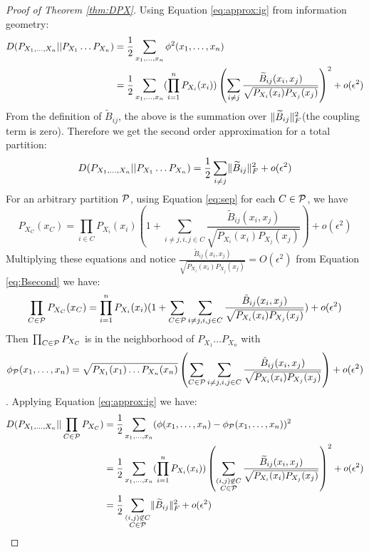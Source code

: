 \begin{proof}[Proof of Theorem \ref{thm:DPX}]
Using Equation \eqref{eq:approx:ig} from information geometry:
\begin{align*}
D(P_{X_1,\dots, X_n}|| P_{X_1}\dots P_{X_n}) & ={1 \over 2} \sum_{x_1,\dots,x_n}\phi^2(x_1,\dots, x_n) \\
& = {1\over 2}\sum_{x_1,\dots,x_n} (\prod_{i=1}^n  P_{X_i} (x_i)) \left(\sum_{i\neq j}{\widetilde{B}_{ij}(x_i, x_j) \over \sqrt{P_{X_i}(x_i)P_{X_j}(x_j)} }\right)^2 +o(\epsilon^2) 
\end{align*}
From the definition of $\widetilde{B}_{ij}$, the above is the summation over $\norm{\widetilde{B}_{ij}}^2_F$(the coupling term is zero). Therefore we get the second order approximation for a total partition:
\begin{equation}
D(P_{X_1,\dots, X_n}|| P_{X_1}\dots P_{X_n}) =   {1 \over 2} \sum_{i\neq j} \norm{\widetilde{B}_{ij}}^2_F + o(\epsilon^2)
\end{equation}
For an arbitrary partition $\P$, using Equation \eqref{eq:sep} for each $C\in \P$, we have
\begin{equation}
P_{X_C}(x_C) = \prod_{i\in C} P_{X_i}(x_i)(1+\sum_{i\neq j,i,j\in C} \frac{\tilde{B}_{ij}(x_i, x_j)}{\sqrt{P_{X_i}(x_i)P_{X_j}(x_j)}}) + o(\epsilon^2)
\end{equation}
Multiplying these equations and notice $\frac{\tilde{B}_{ij}(x_i, x_j)}{\sqrt{P_{X_i}(x_i)P_{X_j}(x_j)}}=O(\epsilon^2)$ from
Equation \eqref{eq:Bsecond} we have:
\begin{equation}
\prod_{C\in \P}P_{X_C}(x_C) = \prod_{i=1}^n P_{X_i}(x_i)(1+\sum_{C\in\P}\sum_{i\neq j,i,j\in C}\frac{\tilde{B}_{ij}(x_i, x_j)}{\sqrt{P_{X_i}(x_i)P_{X_j}(x_j)}}) + o(\epsilon^2)
\end{equation}
Then $\prod_{C\in \P}P_{X_C}$ is in the neighborhood of $P_{X_1}\dots P_{X_n}$ with $$\phi_{\P}(x_1,\dots, x_n)=
\sqrt{P_{X_1}(x_1)\dots P_{X_n}(x_n)}\left(\sum_{C\in\P}\sum_{i\neq j,i,j\in C}\frac{\tilde{B}_{ij}(x_i, x_j)}{\sqrt{P_{X_i}(x_i)P_{X_j}(x_j)}}\right)+o(\epsilon^2)$$.
Applying Equation  \eqref{eq:approx:ig} we have:
\begin{align*}
D(P_{X_1,\dots, X_n}|| \prod_{C\in \P}P_{X_C}) & ={1 \over 2} \sum_{x_1,\dots,x_n}(\phi(x_1,\dots, x_n)-\phi_{\P}(x_1, \dots, x_n))^2 \\
& = {1\over 2}\sum_{x_1,\dots,x_n} (\prod_{i=1}^n  P_{X_i} (x_i)) \left(\sum_{\substack{(i,j) \not\in C\\ C\in \P}} {\widetilde{B}_{ij}(x_i, x_j) \over \sqrt{P_{X_i}(x_i)P_{X_j}(x_j)} }\right)^2 +o(\epsilon^2) \\
& = \frac{1}{2} \sum_{\substack{(i,j) \not\in C\\ C\in \P}} \norm{\widetilde{B}_{ij}}_F^2 + o(\epsilon^2)
\end{align*}
\end{proof}


